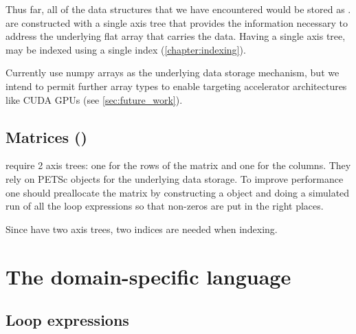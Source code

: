 \documentclass[thesis]{subfiles}
\begin{document}
Thus far, all of the data structures that we have encountered would be stored as .
 are constructed with a single axis tree that provides the information necessary to address the underlying flat array that carries the data.
Having a single axis tree,  may be indexed using a single index (\cref{chapter:indexing}).

Currently  use numpy arrays as the underlying data storage mechanism, but we intend to permit further array types to enable targeting accelerator architectures like CUDA GPUs (see \cref{sec:future_work}).

\subsection{Matrices ()}

 require 2 axis trees: one for the rows of the matrix and one for the columns.
They rely on PETSc  objects for the underlying data storage.
To improve performance one should preallocate the matrix by constructing a  object and doing a simulated run of all the loop expressions so that non-zeros are put in the right places.

Since  have two axis trees, two indices are needed when indexing.

\section{The domain-specific language}
\label{sec:dsl}


\subsection{Loop expressions}

\end{document}
